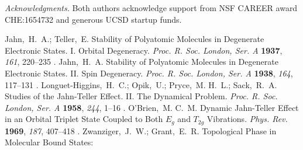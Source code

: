 \documentclass[superscriptaddress,showpacs,amsmath,amssymb,pra,twocolumn]{revtex4-1}
\begin{document}
\emph{Acknowledgments.\textendash{}} 
Both authors acknowledge support from NSF CAREER award CHE:1654732
and generous UCSD startup funds.
\begin{thebibliography}{61}
\providecommand*\natexlab[1]{#1}
\providecommand*\mciteSetBstSublistMode[1]{}
\providecommand*\mciteSetBstMaxWidthForm[2]{}
\providecommand*\mciteBstWouldAddEndPuncttrue
  {\def\EndOfBibitem{\unskip.}}
\providecommand*\mciteBstWouldAddEndPunctfalse
  {\let\EndOfBibitem\relax}
\providecommand*\mciteSetBstMidEndSepPunct[3]{}
\providecommand*\mciteSetBstSublistLabelBeginEnd[3]{}
\providecommand*\EndOfBibitem{}
\mciteSetBstSublistMode{f}
\mciteSetBstMaxWidthForm{subitem}{(\alph{mcitesubitemcount})}
\mciteSetBstSublistLabelBeginEnd
  {\mcitemaxwidthsubitemform\space}
  {\relax}
  {\relax}

Jahn,~H.~A.; Teller,~E. Stability of {{Polyatomic Molecules}} in {{Degenerate
  Electronic States}}. {{I}}. {{Orbital Degeneracy}}. \emph{Proc. R. Soc. London, Ser. A}
  \textbf{1937}, \emph{161}, 220--235\relax
\mciteBstWouldAddEndPuncttrue
\mciteSetBstMidEndSepPunct{\mcitedefaultmidpunct}
{\mcitedefaultendpunct}{\mcitedefaultseppunct}\relax
\EndOfBibitem
{}
Jahn,~H.~A. Stability of {{Polyatomic Molecules}} in {{Degenerate Electronic
  States}}. {{II}}. {{Spin Degeneracy}}. \emph{Proc. R. Soc. London, Ser. A} \textbf{1938},
  \emph{164}, 117--131\relax
\mciteBstWouldAddEndPuncttrue
\mciteSetBstMidEndSepPunct{\mcitedefaultmidpunct}
{\mcitedefaultendpunct}{\mcitedefaultseppunct}\relax
\EndOfBibitem
{}
Longuet-Higgins,~H.~C.; Opik,~U.; Pryce,~M. H.~L.; Sack,~R.~A. Studies of the
  {{Jahn}}-{{Teller Effect}}. {{II}}. {{The Dynamical Problem}}.
  \emph{Proc. R. Soc. London, Ser. A} \textbf{1958}, \emph{244}, 1--16\relax
\mciteBstWouldAddEndPuncttrue
\mciteSetBstMidEndSepPunct{\mcitedefaultmidpunct}
{\mcitedefaultendpunct}{\mcitedefaultseppunct}\relax
\EndOfBibitem
{}
O'Brien,~M. C.~M. Dynamic Jahn-Teller Effect in an {{Orbital Triplet
  State Coupled}} to Both $E_g$ and
  $T_{2g}$ Vibrations. \emph{Phys. Rev.} \textbf{1969}, \emph{187},
  407--418\relax
\mciteBstWouldAddEndPuncttrue
\mciteSetBstMidEndSepPunct{\mcitedefaultmidpunct}
{\mcitedefaultendpunct}{\mcitedefaultseppunct}\relax
\EndOfBibitem
{}
Zwanziger,~J.~W.; Grant,~E.~R. Topological Phase in Molecular Bound States:

\end{thebibliography}
\end{document}
